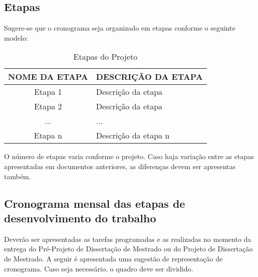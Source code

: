 \subsection{Etapas}
Sugere-se que o cronograma seja organizado em etapas conforme o seguinte modelo:

\begin{table}[htbp]
	\centering
	\begin{tabular}{|c|p{8cm}|}
		\hline
		NOME DA ETAPA & DESCRIÇÃO DA ETAPA \\ \hline
		Etapa 1 & Descrição da etapa  \\ \hline
		Etapa 2 & Descrição da etapa  \\ \hline
		... & ... \\ \hline
		Etapa n & Descrição da etapa n \\ \hline
	\end{tabular}
	\caption{Etapas do Projeto}
	\label{quadro:etapas}
\end{table}

O número de etapas varia conforme o projeto. Caso haja variação entre as etapas apresentadas em documentos anteriores, as diferenças devem ser apresentas também.

\subsection{Cronograma mensal das etapas de desenvolvimento do trabalho}

Deverão ser apresentadas as tarefas programadas e as realizadas no momento da entrega do Pré-Projeto de Dissertação de Mestrado ou do Projeto de Dissertação de Mestrado. A seguir é apresentada uma sugestão de representação de cronograma. Caso seja necessário, o quadro deve ser dividido.


